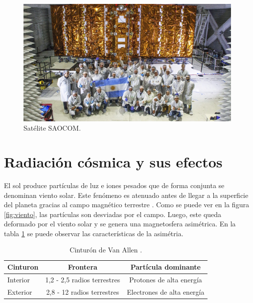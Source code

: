 \begin{figure}[htbp]
	\centering
	\includegraphics[width=\textwidth]{./Figures/invapsaocom.jpg}
	\caption{Satélite SAOCOM\protect\footnotemark.}
	\label{fig:saocom}
\end{figure}


\section{Radiación cósmica y sus efectos}
\label{sec:radiacion}

El sol produce partículas de luz e iones pesados que de forma conjunta se denominan viento solar.
Este fenómeno es atenuado antes de llegar a la superficie del planeta gracias al campo magnético terrestre \citep{WEBSITE:structure_space_radiation}.
Como se puede ver en la figura \ref{fig:viento}, las partículas son desviadas por el campo.
Luego, este queda deformado por el viento solar y se genera una magnetosfera asimétrica.
En la tabla \ref{tab:capasmagneticas} se puede observar las características de la asimétria.

\begin{table}[h]
	\centering
	\caption[Cinturón de Van Allen]{Cinturón de Van Allen \citep{WEBSITE:structure_space_radiation}.}
	\begin{tabular}{l c c}    
		\toprule
		\textbf{Cinturon} & \textbf{Frontera}           & \textbf{Partícula dominante}\\
		\midrule
		Interior          & 1,2 - 2,5 radios terrestres & Protones de alta energía\\		
		Exterior          & 2,8 - 12 radios terrestres  & Electrones de alta energía\\
		\bottomrule
		\hline
	\end{tabular}
	\label{tab:capasmagneticas}
\end{table}

